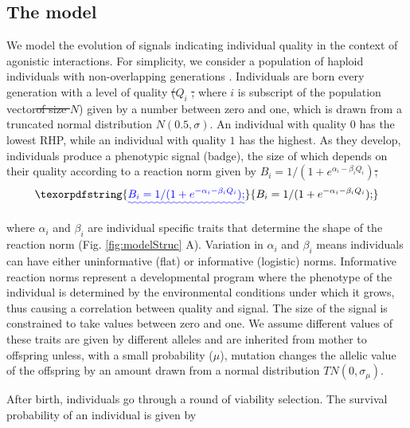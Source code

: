 \documentclass[
  12pt,
]{article}
\providecommand{\DIFaddtex}[1]{{\protect\color{blue}\uwave{#1}}} %
\providecommand{\DIFdeltex}[1]{{\protect\color{red}\sout{#1}}}                      %
\providecommand{\DIFaddbegin}{} %
\providecommand{\DIFaddend}{} %
\providecommand{\DIFdelbegin}{} %
\providecommand{\DIFdelend}{} %
\providecommand{\DIFadd}[1]{\texorpdfstring{\DIFaddtex{#1}}{#1}} %
\providecommand{\DIFdel}[1]{\texorpdfstring{\DIFdeltex{#1}}{}} %
\newcommand{\DIFscaledelfig}{0.5}
\newlength{\DIFdelgraphicswidth} %
\newlength{\DIFdelgraphicsheight} %
\newcommand{\DIFaddincludegraphics}[2][]{{\color{blue}\fbox{\DIFOincludegraphics[#1]{#2}}}} %
\newcommand{\DIFdelincludegraphics}[2][]{%
\sbox{\DIFdelgraphicsbox}{\DIFOincludegraphics[#1]{#2}}%
\settoboxwidth{\DIFdelgraphicswidth}{\DIFdelgraphicsbox} %
\settoboxtotalheight{\DIFdelgraphicsheight}{\DIFdelgraphicsbox} %
\scalebox{\DIFscaledelfig}{%
\parbox[b]{\DIFdelgraphicswidth}{\usebox{\DIFdelgraphicsbox}\\[-\baselineskip] \rule{\DIFdelgraphicswidth}{0em}}\llap{\resizebox{\DIFdelgraphicswidth}{\DIFdelgraphicsheight}{%
\setlength{\unitlength}{\DIFdelgraphicswidth}%
\begin{picture}(1,1)%
\thicklines\linethickness{2pt} %
{\color[rgb]{1,0,0}\put(0,0){\framebox(1,1){}}}%
{\color[rgb]{1,0,0}\put(0,0){\line( 1,1){1}}}%
{\color[rgb]{1,0,0}\put(0,1){\line(1,-1){1}}}%
\end{picture}%
}\hspace*{3pt}}} %
} %
\DeclareRobustCommand{\DIFaddbegin}{\DIFOaddbegin \let\includegraphics\DIFaddincludegraphics} %
\DeclareRobustCommand{\DIFaddend}{\DIFOaddend \let\includegraphics\DIFOincludegraphics} %
\DeclareRobustCommand{\DIFdelbegin}{\DIFOdelbegin \let\includegraphics\DIFdelincludegraphics} %
\DeclareRobustCommand{\DIFdelend}{\DIFOaddend \let\includegraphics\DIFOincludegraphics} %
\begin{document}
\hypertarget{the-model}{%
\subsection{The model}\label{the-model}}

We model the evolution of signals indicating individual quality in the
context of agonistic interactions. For simplicity, we consider a
population of haploid individuals with non-overlapping generations \DIFaddbegin \DIFadd{of
size \(N=3000\)}\DIFaddend . Individuals are born every generation with a level of
quality \DIFdelbegin \DIFdel{(}\DIFdelend \(Q_i\) \DIFdelbegin \DIFdel{,
}\DIFdelend \DIFaddbegin \DIFadd{(}\DIFaddend where \(i\) is subscript of the population vector\DIFdelbegin \DIFdel{of size \(N\)}\DIFdelend )
given by a number between zero and one, which is drawn from a truncated
normal distribution \DIFdelbegin \DIFdel{\(N( 0.5,\sigma)\)}\DIFdelend \DIFaddbegin \DIFadd{\(TN( 0.5,\sigma)\)}\DIFaddend . An individual with quality
\(0\) has the lowest RHP, while an individual with quality \(1\) has the
highest. As they develop, individuals produce a phenotypic signal
(badge), the size of which depends on their quality according to a
\DIFaddbegin \DIFadd{logistic }\DIFaddend reaction norm given by \DIFdelbegin \DIFdel{\(B_i=1/(1+e^{\alpha_i-\beta_i Q_i})\); }\DIFdelend \DIFaddbegin \begin{equation}
\DIFadd{B_i=1/(1+e^{-\alpha_i-\beta_i Q_i}) \textrm{;}\label{eq:reacNorm}
}\end{equation}

\DIFaddend where \(\alpha_i\) and \(\beta_i\) are individual specific traits that
determine the shape of the reaction norm (Fig. \ref{fig:modelStruc} A).
Variation in \(\alpha_i\) and \(\beta_i\) means individuals can have
either uninformative (flat) or informative (logistic) norms. Informative
reaction norms represent a developmental program where the phenotype of
the individual is determined by the environmental conditions under which
it grows, thus causing a correlation between quality and signal. The
size of the signal is constrained to take values between zero and one.
We assume different values of these traits are given by different
alleles and are inherited from mother to offspring unless, with a small
probability (\(\mu\)), mutation changes the allelic value of the
offspring by an amount drawn from a normal distribution
\DIFdelbegin \DIFdel{\(TN(0,\sigma_\mu)\)}\DIFdelend \DIFaddbegin \DIFadd{\(N(0,\sigma_\mu)\)}\DIFaddend .

After birth, individuals go through a round of viability selection. The
survival probability of an individual is given by
\end{document}
